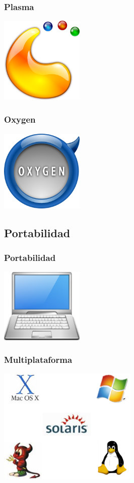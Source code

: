 \documentclass[12pt]{beamer}
\begin{document}
\begin{frame}
\frametitle{Plasma}
\begin{center}
	\includegraphics[width=150px]{imatges/plasma.png}
\end{center}
\end{frame}
\begin{frame}
\frametitle{Oxygen}
\begin{center}
	\includegraphics[width=150px]{imatges/oxygen.png}
\end{center}
\end {frame}
\subsection{Portabilidad}
\begin {frame}
	\frametitle{Portabilidad}
	\begin{center}
	\includegraphics[width=150px]{imatges/portability.png}
	\end{center}
\end {frame}

\begin{frame}
	\frametitle{ Multiplataforma }

	\center \includegraphics[width=250px]{imatges/plataformas.png}

\end{frame}
\end{document}
